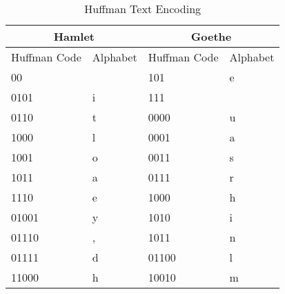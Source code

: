 \documentclass[12pt, authoryear]{elsarticle}
\begin{document}
\begin{table}[]
	\caption{Huffman Text Encoding}
	\label{my-label}
	\begin{tabular}{|l|l|l|l|}
		\hline
		\multicolumn{2}{|c|}{\cellcolor[HTML]{C0C0C0}\textbf{Hamlet}} & \multicolumn{2}{c|}{\cellcolor[HTML]{C0C0C0}\textbf{Goethe}} \\ \hline
		Huffman Code                  & Alphabet                      & Huffman Code                    & Alphabet                   \\ \hline
		00                             &   \textvisiblespace                            & 101                              & e                          \\
		0101                           & i                             & 111                             &             \textvisiblespace               \\
		0110                           & t                             & 0000                               & u                          \\
		1000                          & l                             & 0001                               & a                          \\
		1001                          & o                             & 0011                              & s                          \\
		1011                          & a                             & 0111                             & r                          \\
		1110                          & e                             & 1000                            & h                          \\
		01001                          & y                             & 1010                            & i                          \\
		01110                          & ,                             & 1011                            & n                          \\
		01111                          & d                             & 01100                            & l                          \\
		11000                         & h                             & 10010                           & m                          \\

\end{tabular}
\end{table}
\end{document}
